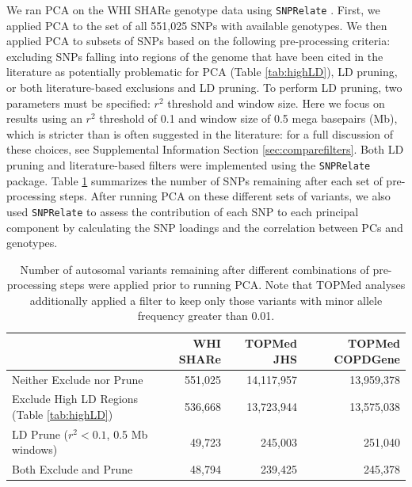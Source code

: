 \documentclass[12pt]{article}
\begin{document}
We ran PCA on the WHI SHARe genotype data using \texttt{SNPRelate} \citep{snprelate}. 
First, we applied PCA to the set of all 551,025 SNPs with available genotypes.
We then applied PCA to subsets of SNPs based on the following pre-processing criteria: excluding SNPs falling into regions of the genome that have been cited in the literature as potentially problematic for PCA (Table \ref{tab:highLD}), LD pruning, or both literature-based exclusions and LD pruning.
To perform LD pruning, two parameters must be specified: $r^2$ threshold and window size. 
Here we focus on results using an $r^2$ threshold of 0.1 and window size of 0.5 mega basepairs (Mb), which is stricter than is often suggested in the literature: for a full discussion of these choices, see Supplemental Information Section \ref{sec:comparefilters}.
Both LD pruning and literature-based filters were implemented using the \texttt{SNPRelate} package.
Table \ref{tab:preprocessN} summarizes the number of SNPs remaining after each set of pre-processing steps.
After running PCA on these different sets of variants, we also used \texttt{SNPRelate} to assess the contribution of each SNP to each principal component by calculating the SNP loadings and the correlation between PCs and genotypes.

\begin{table}
\small
\begin{tabular}{|l|rrr|}
\hline
 & WHI SHARe & TOPMed JHS & TOPMed COPDGene \\
\hline
Neither Exclude nor Prune & 551,025 & 14,117,957 & 13,959,378 \\
Exclude High LD Regions (Table \ref{tab:highLD}) & 536,668 & 13,723,944 & 13,575,038  \\
LD Prune ($r^2 < 0.1$, 0.5 Mb windows) & 49,723  &  245,003 & 251,040  \\
Both Exclude and Prune & 48,794 & 239,425  & 245,378  \\
\hline
\end{tabular}
\caption{Number of autosomal variants remaining after different combinations of pre-processing steps were applied prior to running PCA. Note that TOPMed analyses additionally applied a filter to keep only those variants with minor allele frequency greater than 0.01.} 
\label{tab:preprocessN}
\end{table}
\end{document}
